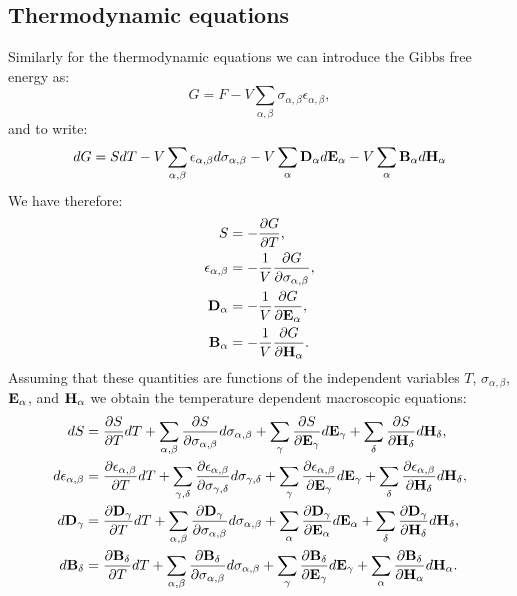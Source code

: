 \documentclass[12pt,a4paper]{article}
\begin{document}
\subsection{Thermodynamic equations}
Similarly for the thermodynamic equations we can introduce the Gibbs
free energy as:
\begin{equation}
G=F - V \sum_{\alpha,\beta} \sigma_{\alpha,\beta} \epsilon_{\alpha,\beta},
\end{equation}
and to write:
\begin{equation}
dG=SdT - V \sum_{\alpha,\beta} \epsilon_{\alpha,\beta} d \sigma_{\alpha,\beta}
-V \sum_{\alpha} {\bf D}_\alpha d {\bf E}_\alpha
-V \sum_{\alpha} {\bf B}_\alpha d {\bf H}_\alpha
\end{equation}
We have therefore:
\begin{align}
S&= -{\partial G \over \partial T}, \\
\epsilon_{\alpha,\beta}&= -{1\over V}
{\partial G \over \partial \sigma_{\alpha,\beta}}, \\
{\bf D}_{\alpha}&= -{1\over V}
{\partial G \over \partial {\bf E}_{\alpha}}, \\
{\bf B}_{\alpha}&= -{1\over V}
{\partial G \over \partial {\bf H}_{\alpha}}.
\end{align}
Assuming that these quantities are functions of the independent variables
$T$, $\sigma_{\alpha,\beta}$, ${\bf E}_\alpha$, and ${\bf H}_\alpha$ we
obtain the temperature dependent macroscopic equations:
\begin{align}
dS&= {\partial S \over \partial T} dT+\sum_{\alpha,\beta}
{\partial S \over \partial \sigma_{\alpha,\beta}}d\sigma_{\alpha,\beta}
+\sum_\gamma{\partial S \over \partial {\bf E}_{\gamma}}d{\bf E}_{\gamma}+ 
\sum_\delta{\partial S \over \partial {\bf H}_{\delta}}d{\bf H}_{\delta}, \\
d\epsilon_{\alpha,\beta}&=
{\partial \epsilon_{\alpha,\beta} \over \partial T} dT+\sum_{\gamma,\delta}
{\partial \epsilon_{\alpha,\beta} \over \partial 
\sigma_{\gamma,\delta}}d\sigma_{\gamma,\delta}
+\sum_\gamma{\partial \epsilon_{\alpha,\beta} \over \partial 
{\bf E}_{\gamma}}d{\bf E}_{\gamma}+ 
\sum_\delta{\partial \epsilon_{\alpha,\beta} \over \partial 
{\bf H}_{\delta}}d{\bf H}_{\delta}, \\
d{\bf D}_\gamma&=
{\partial  {\bf D}_\gamma \over \partial T} dT+\sum_{\alpha,\beta}
{\partial {\bf D}_\gamma \over \partial \sigma_{\alpha,\beta}}
d\sigma_{\alpha,\beta}
+\sum_\alpha{\partial {\bf D}_\gamma \over \partial {\bf E}_{\alpha}}d{\bf E}_{\alpha}+ 
\sum_\delta{\partial {\bf D}_\gamma \over \partial {\bf H}_{\delta}}d{\bf H}_{\delta}, \\
d{\bf B}_\delta&=
{\partial {\bf B}_\delta \over \partial T} dT+\sum_{\alpha,\beta}
{\partial {\bf B}_\delta \over \partial \sigma_{\alpha,\beta}}
d\sigma_{\alpha,\beta}
+\sum_\gamma{\partial {\bf B}_\delta \over \partial {\bf E}_{\gamma}}
d{\bf E}_{\gamma}+ 
\sum_\alpha{\partial {\bf B}_\delta \over \partial {\bf H}_{\alpha}}
d{\bf H}_{\alpha}. 
\end{align}
\end{document}
